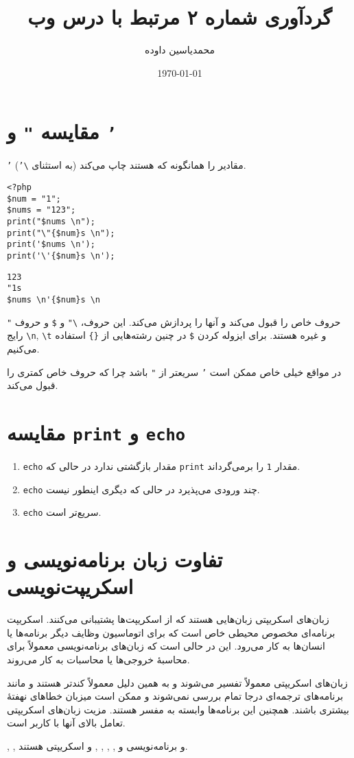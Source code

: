 \documentclass[a4paper]{article}
\author{محمدیاسین داوده}
\date{\today}
\title{گردآوری شماره ۲ مرتبط با درس وب}
\begin{document}
\maketitle

\section{مقایسه \texttt{"} و \texttt{'}}
\label{sec:org3a0fd62}
\texttt{'} مقادیر را همانگونه که هستند چاپ می‌کند (به استثنای \texttt{\textbackslash{}'}).

\begin{verbatim}
<?php
$num = "1";
$nums = "123";
print("$nums \n");
print("\"{$num}s \n");
print('$nums \n');
print('\'{$num}s \n');
\end{verbatim}

\begin{verbatim}
123 
"1s 
$nums \n'{$num}s \n
\end{verbatim}


\texttt{"} حروف خاص را قبول می‌کند و آنها را پردازش می‌کند. این حروف، \texttt{\textbackslash{}"} و \texttt{\$} و حروف رایج \texttt{\textbackslash{}n}, \texttt{\textbackslash{}t} و غیره هستند.
برای ایزوله کردن \texttt{\$} در چنین رشته‌هایی از \texttt{\{\}} استفاده می‌کنیم.

در مواقع خیلی خاص ممکن است \texttt{'} سریعتر از \texttt{"} باشد چرا که حروف خاص کمتری را قبول می‌کند.

\section{مقایسه \texttt{print} و \texttt{echo}}
\label{sec:orgae6434f}
\begin{enumerate}
\item \texttt{echo} مقدار بازگشتی ندارد در حالی که \texttt{print} مقدار \texttt{1} را برمی‌گرداند.
\item \texttt{echo} چند ورودی می‌پذیرد در حالی که دیگری اینطور نیست.
\item \texttt{echo} سریع‌تر است.
\end{enumerate}

\section{تفاوت زبان برنامه‌نویسی و اسکریپت‌نویسی}
\label{sec:org614d813}
زبان‌های اسکریپتی زبان‌هایی هستند که از اسکریپت‌ها پشتیبانی می‌کنند.
اسکریپت برنامه‌ای مخصوص محیطی خاص است که برای اتوماسیون وظایف دیگر برنامه‌ها یا انسان‌ها به کار می‌رود. این در حالی است که زبان‌های برنامه‌نویسی معمولاً برای محاسبهٔ خروجی‌ها یا محاسبات به کار می‌روند.

زبان‌های اسکریپتی معمولاً تفسیر می‌شوند و به همین دلیل
معمولاً کندتر هستند و مانند برنامه‌های ترجمه‌ای درجا تمام بررسی نمی‌شوند و ممکن است  میزبان خطاهای نهفتهٔ بیشتری باشند. همچنین این برنامه‌ها وابسته به مفسر هستند.
مزیت زبان‌های اسکریپتی تعامل بالای آنها با کاربر است.

, ,  و  برنامه‌نویسی و
, , , ,  و  اسکریپتی هستند.
\end{document}

